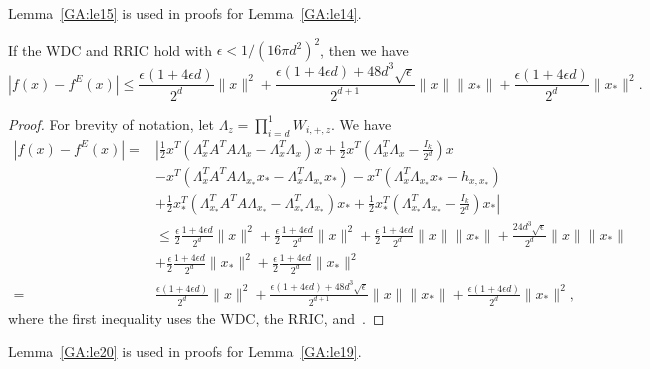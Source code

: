 Lemma~\ref{GA:le15} is used in proofs for Lemma~\ref{GA:le14}.

\begin{lemma} \label{GA:le15}
If
the WDC and RRIC
hold with $\epsilon < 1 / (16 \pi d^2)^2$, then we have
\begin{equation*}
|f(x) - {f^E}(x)| \leq \frac{\epsilon (1 + 4 \epsilon d)}{2^d} \|x\|^2 + \frac{\epsilon(1 + 4 \epsilon d) + 48 d^3 \sqrt{\epsilon}}{2^{d+1}} \|x\| \|x_*\| + \frac{\epsilon (1 + 4 \epsilon d)}{2^d} \|x_*\|^2.
\end{equation*}
\end{lemma}
\begin{proof}
For brevity of notation, let $\Lambda_{z} = \prod_{i = d}^1 W_{i, +, z}$.
We have
\begin{align*}
\left|f(x) - {f^E}(x) \right| =& \left|\frac{1}{2} x^T \left( \Lambda_{x}^T A^T A \Lambda_{x} - \Lambda_{x}^T \Lambda_{x} \right) x \right. + \frac{1}{2} x^T \left( \Lambda_{x}^T \Lambda_{x} - \frac{I_k}{2^d} \right) x \\
& - x^T \left( \Lambda_{x}^T A^T A \Lambda_{x_*} x_* -  \Lambda_{x}^T \Lambda_{x_*} x_* \right) - x^T \left( \Lambda_{x}^T \Lambda_{x_*} x_* - h_{x, x_*} \right) \\
&+ \frac{1}{2} x_*^T \left(\Lambda_{x_*}^T A^T A \Lambda_{x_*} - \Lambda_{x_*}^T \Lambda_{x_*} \right) x_* + \left. \frac{1}{2} x_*^T \left(\Lambda_{x_*}^T \Lambda_{x_*} - \frac{I_k}{2^d} \right) x_* \right| \\
&\leq \frac{\epsilon}{2} \frac{1 + 4 \epsilon d}{2^d} \|x\|^2 + \frac{\epsilon}{2} \frac{1 + 4 \epsilon d}{2^d} \|x\|^2 +  \frac{\epsilon}{2} \frac{1 + 4 \epsilon d}{2^d} \|x\| \|x_*\| + \frac{24 d^3 \sqrt{\epsilon}}{2^d} \|x\| \|x_*\| \\
&+ \frac{\epsilon}{2} \frac{1 + 4 \epsilon d}{2^d} \|x_*\|^2 + \frac{\epsilon}{2} \frac{1 + 4 \epsilon d}{2^d} \|x_*\|^2\\
=& \frac{\epsilon (1 + 4 \epsilon d)}{2^d} \|x\|^2 + \frac{\epsilon(1 + 4 \epsilon d) + 48 d^3 \sqrt{\epsilon}}{2^{d+1}} \|x\| \|x_*\| + \frac{\epsilon (1 + 4 \epsilon d)}{2^d} \|x_*\|^2,
\end{align*}
where the first inequality uses the WDC, the RRIC, and~\cite[Lemma~6]{HV17}.
\end{proof}

Lemma~\ref{GA:le20} is used in proofs for Lemma~\ref{GA:le19}.


